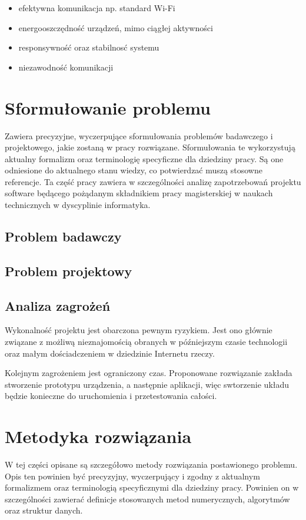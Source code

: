 \begin{itemize}
	\item efektywna komunikacja np. standard Wi-Fi
	\item energooszczędność urządzeń, mimo ciągłej aktywności
	\item responsywność oraz stabilnosć systemu
	\item niezawodność komunikacji
\end{itemize}


\section{Sformułowanie problemu}
\label{sec:sformulowanie-problemu}
Zawiera precyzyjne, wyczerpujące sformułowania problemów badawczego i projektowego, jakie zostaną w pracy rozwiązane. Sformułowania te wykorzystują aktualny formalizm oraz terminologię specyficzne dla dziedziny pracy. Są one odniesione do aktualnego stanu wiedzy, co potwierdzać muszą stosowne referencje. Ta część pracy zawiera w szczególności analizę zapotrzebowań projektu software będącego pożądanym składnikiem pracy magisterskiej w naukach technicznych w dyscyplinie informatyka.

\subsection{Problem badawczy}

\subsection{Problem projektowy}

\subsection{Analiza zagrożeń}
Wykonalność projektu jest obarczona pewnym ryzykiem. Jest ono głównie związane z możliwą nieznajomością obranych w późniejszym czasie technologii oraz małym dościadczeniem w dziedzinie Internetu rzeczy.

Kolejnym zagrożeniem jest ograniczony czas. Proponowane rozwiązanie zakłada stworzenie prototypu urządzenia, a następnie aplikacji, więc swtorzenie układu będzie konieczne do uruchomienia i przetestowania całości.


\section{Metodyka rozwiązania}
\label{sec:metodyka-rozwiazania}
W tej części opisane są szczegółowo metody rozwiązania postawionego problemu. Opis ten powinien być precyzyjny, wyczerpujący i zgodny z aktualnym formalizmem oraz terminologią specyficznymi dla dziedziny pracy. Powinien on w szczególności zawierać definicje stosowanych metod numerycznych, algorytmów oraz struktur danych.


